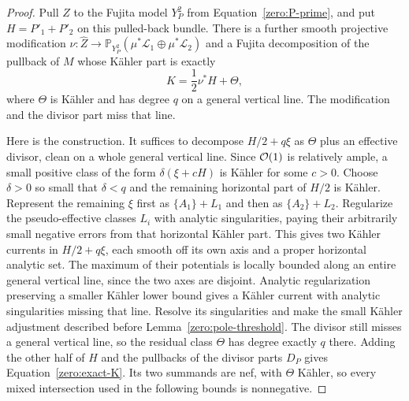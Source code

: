 \begin{proof}
Pull \(Z\) to the Fujita model \(Y_P^2\) from
Equation~\eqref{zero:P-prime}, and put \(H=P'_1+P'_2\) on this pulled-back bundle.
There is a further smooth projective modification
\(\nu:\widehat Z\to\mathbb{P}_{Y_P^2}(\mu^*\mathscr L_1\oplus
\mu^*\mathscr L_2)\) and a Fujita decomposition of the pullback of \(M\)
whose Kähler part is exactly
\begin{equation}\label{zero:exact-K}
 K=\frac12\nu^*H+\Theta ,
\end{equation}
where \(\Theta\) is Kähler and has degree \(q\) on a general vertical
line.  The modification and the divisor part miss that line.

Here is the construction.  It suffices to decompose \(H/2+q\xi\) as
\(\Theta\) plus an effective divisor, clean on a whole general vertical
line.  Since \(\mathcal O(1)\) is relatively ample, a small positive class of
the form \(\delta(\xi+cH)\) is Kähler for some \(c>0\).  Choose
\(\delta>0\) so small that \(\delta<q\) and the remaining horizontal
part of \(H/2\) is Kähler.  Represent the remaining \(\xi\) first as
\(\{A_1\}+L_1\) and then as \(\{A_2\}+L_2\).  Regularize the
pseudo-effective classes \(L_i\) with analytic singularities, paying
their arbitrarily small negative errors from that horizontal Kähler
part.  This gives two Kähler currents in \(H/2+q\xi\), each smooth off
its own axis and a proper horizontal analytic set.  The maximum of
their potentials is locally bounded along an entire general vertical
line, since the two axes are disjoint.  Analytic regularization
preserving a smaller Kähler lower bound
\cite[Theorem~2.1(ii)]{Boucksom2004} gives a Kähler current with
analytic singularities missing that line.  Resolve its singularities
and make the small Kähler adjustment described before
Lemma~\ref{zero:pole-threshold}.  The divisor still misses a general
vertical line, so the residual class \(\Theta\) has degree exactly
\(q\) there.  Adding the other half of \(H\) and the pullbacks of the
divisor parts \(D_P\) gives Equation~\eqref{zero:exact-K}.  Its two
summands are nef, with \(\Theta\) Kähler, so every mixed intersection
used in the following bounds is nonnegative.


\end{proof}
